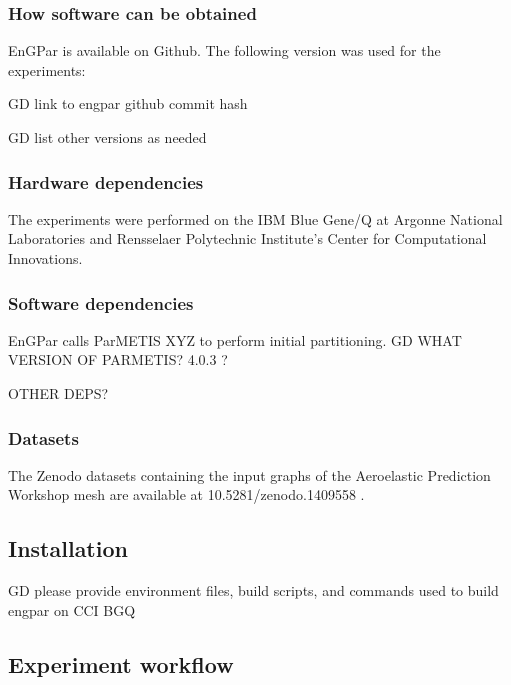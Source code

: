 \subsubsection{How software can be obtained}

EnGPar is available on Github.  The following version was used for the
experiments:

{\color{red} GD link to engpar github commit hash}

{\color{red} GD list other versions as needed}

\subsubsection{Hardware dependencies}

The experiments were performed on the IBM Blue Gene/Q at Argonne National
Laboratories and Rensselaer Polytechnic Institute's Center for Computational
Innovations.

\subsubsection{Software dependencies}

EnGPar calls ParMETIS XYZ to perform initial partitioning.
{\color{red} GD WHAT VERSION OF PARMETIS? 4.0.3 ?}

{\color{red} OTHER DEPS?}

\subsubsection{Datasets}

The Zenodo datasets containing the input graphs of the Aeroelastic Prediction
Workshop mesh are available at 10.5281/zenodo.1409558 .

\subsection{Installation}

{\color{red} GD please provide environment files, build scripts, and commands
used to build engpar on CCI BGQ}

\subsection{Experiment workflow}

